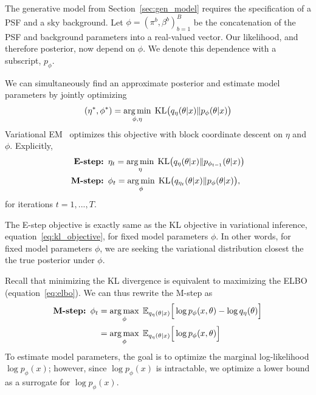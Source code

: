 The generative model from Section~\ref{sec:gen_model} requires
the specification of a PSF and a sky background. Let $\phi = (\pi^b, \beta^b)_{b = 1}^B$ be the concatenation of the PSF and background parameters into a real-valued vector. 
Our likelihood, and therefore posterior, now depend on $\phi$. We denote this dependence with a subscript, $p_\phi$. 

We can simultaneously find an approximate posterior and 
estimate model parameters by jointly optimizing 
\begin{align}
(\eta^*, \phi^*) = \operatorname*{arg\,min}_{\phi, \eta} \; \mathrm{KL}\big (q_{\eta}(\theta |x) \| p_{\phi}(\theta | x)\big)\label{eq:em_obj}
\end{align}
Variational EM~\cite{Jordan_intro_vi, neal2000varem, Beal2002varem} optimizes this objective with block coordinate descent on $\eta$ and $\phi$. Explicitly, 
\begin{align}
    \text{{\bf E-step: }} & 
    \eta_{t} = \operatorname*{arg\,min}_\eta \; \mathrm{KL}\big (q_{\eta    }(\theta |x) \| p_{\phi_{t - 1}}(\theta | x)\big)
    \label{eq:e_step}
    \\
    \text{{\bf M-step: }} & \phi_{t} = \operatorname*{arg\,min}_{\phi} \; \mathrm{KL}\big (q_{\eta_t}(\theta |x) \| p_{\phi}(\theta | x)\big), 
    \label{eq:m_step}
\end{align}
for iterations $t = 1, ..., T$. 

The E-step objective is exactly same as the KL objective in variational inference, equation~\eqref{eq:kl_objective}, for fixed model parameters $\phi$. 
In other words, for fixed model parameters $\phi$, we are seeking the variational distribution closest the the true posterior under $\phi$. 

Recall that minimizing the KL divergence is equivalent to maximizing the ELBO (equation~\eqref{eq:elbo}). We can thus rewrite the M-step as 
\begin{align}
    \text{{\bf M-step: }} \phi_{t} &= \operatorname*{arg\,max}_{\phi} \; \mathbb{E}_{q_{\eta}(\theta | x)}\Big[\log p_\phi(x, \theta) - \log q_\eta(\theta)\Big] \\
    &= \operatorname*{arg\,max}_{\phi} \; \mathbb{E}_{q_{\eta}(\theta | x)}\Big[\log p_\phi(x, \theta)\Big]    \label{eq:m_step}
\end{align} 
To estimate model parameters, the goal is to optimize the marginal log-likelihood $\log p_\phi(x)$; however, since $\log p_\phi(x)$ is intractable, we optimize a lower bound as a surrogate for $\log p_\phi(x)$. 

